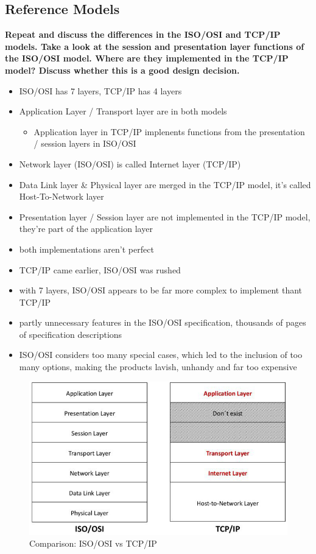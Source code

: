 \documentclass[a4paper,12pt]{article}
\begin{document}
\subsection{Reference Models}
	\textbf{Repeat and discuss the differences in the ISO/OSI and TCP/IP models. Take a look at the session and presentation layer functions of the ISO/OSI model. Where are they implemented in the TCP/IP model? Discuss whether this is a good design decision.}\\
	
	
	\begin{itemize}[itemsep=0pt]
		\item  ISO/OSI has 7 layers, TCP/IP has 4 layers
		\item  Application Layer / Transport layer are in both models
		\begin{itemize}
			\item  Application layer in TCP/IP implenents functions from the presentation / session layers in ISO/OSI
		\end{itemize}
		\item  Network layer (ISO/OSI) is called Internet layer (TCP/IP)
		\item  Data Link layer \& Physical layer are merged in the TCP/IP model, it's called Host-To-Network layer
		\item  Presentation layer / Session layer are not implemented in the TCP/IP model, they're part of the application layer
		\item  both implementations aren't perfect
		\item  TCP/IP came earlier, ISO/OSI was rushed
		\item  with 7 layers, ISO/OSI appears to be far more complex to implement thant TCP/IP
		\item  partly unnecessary features in the ISO/OSI specification, thousands of pages of specification descriptions
		\item  ISO/OSI considers too many special cases, which led to the inclusion of too many options, making the products lavish, unhandy and far too expensive
	\end{itemize}
	\begin{figure}[h!]
		\begin{center}
			\includegraphics[width=0.7\linewidth]{TCP-OSI.png} 
			\caption{Comparison: ISO/OSI vs TCP/IP}
		\end{center}
	\end{figure}
	
\end{document}
